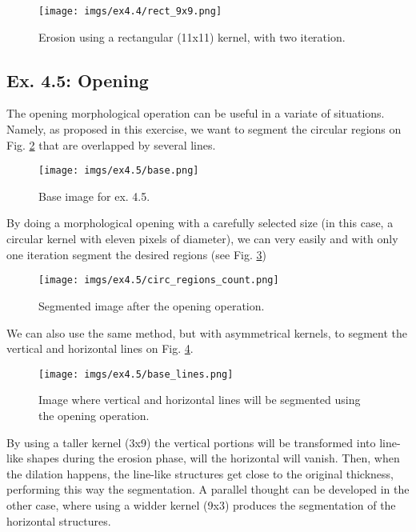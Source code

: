 \documentclass[journal]{IEEEtran}
\begin{document}
\begin{figure}[htp]
  \centering
  \texttt{[image: imgs/ex4.4/rect\_9x9.png]}
  \caption{Erosion using a rectangular (11x11) kernel, with two iteration.}
  \label{fig:4.4_rect_9x9}
\end{figure}
\FloatBarrier

\subsection{Ex. 4.5: Opening}

The opening morphological operation can be useful in a variate of situations. Namely, as proposed in this exercise, we want to segment the circular regions on Fig. \ref{fig:4.5_base} that are overlapped by several lines.

\begin{figure}[htp]
  \centering
  \texttt{[image: imgs/ex4.5/base.png]}
  \caption{Base image for ex. 4.5.}
  \label{fig:4.5_base}
\end{figure}
\FloatBarrier

By doing a morphological opening with a carefully selected size (in this case, a circular kernel with eleven pixels of diameter), we can very easily and with only one iteration segment the desired regions (see Fig. \ref{fig:4.5_opening_count}) 

\begin{figure}[htp]
  \centering
  \texttt{[image: imgs/ex4.5/circ\_regions\_count.png]}
  \caption{Segmented image after the opening operation.}
  \label{fig:4.5_opening_count}
\end{figure}
\FloatBarrier

We can also use the same method, but with asymmetrical kernels, to segment the vertical and horizontal lines on Fig. \ref{fig:4.5_base_lines}.

\begin{figure}[htp]
  \centering
  \texttt{[image: imgs/ex4.5/base\_lines.png]}
  \caption{Image where vertical and horizontal lines will be segmented using the opening operation.}
  \label{fig:4.5_base_lines}
\end{figure}
\FloatBarrier

By using a taller kernel (3x9) the vertical portions will be transformed into line-like shapes during the erosion phase, will the horizontal will vanish. Then, when the dilation happens, the line-like structures get close to the original thickness, performing this way the segmentation. A parallel thought can be developed in the other case, where using a widder kernel (9x3) produces the segmentation of the horizontal structures. 
\end{document}
